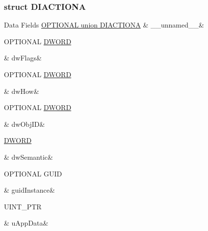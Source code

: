 \subsubsection{struct D\-I\-A\-C\-T\-I\-O\-N\-A}
\begin{DoxyFields}{Data Fields}
\hypertarget{a00003_ab73af551656ca75cd1eff9df6003a2ff}{\hyperlink{a00003_d1/dea/a00054}{O\-P\-T\-I\-O\-N\-A\-L union D\-I\-A\-C\-T\-I\-O\-N\-A}}\label{a00003_ab73af551656ca75cd1eff9df6003a2ff}
&
\-\_\-\-\_\-unnamed\-\_\-\-\_\-&
\\
\hline

\hypertarget{a00003_a1badbf389e47c0cd33257c97bd671136}{O\-P\-T\-I\-O\-N\-A\-L \hyperlink{a00003_a50e15ae51c87ae06ab29c8148cb5f36c}{D\-W\-O\-R\-D}}\label{a00003_a1badbf389e47c0cd33257c97bd671136}
&
dw\-Flags&
\\
\hline

\hypertarget{a00003_a16b081e3e54c30045be9fc209e1240ae}{O\-P\-T\-I\-O\-N\-A\-L \hyperlink{a00003_a50e15ae51c87ae06ab29c8148cb5f36c}{D\-W\-O\-R\-D}}\label{a00003_a16b081e3e54c30045be9fc209e1240ae}
&
dw\-How&
\\
\hline

\hypertarget{a00003_a731348d40f8359f7188f74164a32151e}{O\-P\-T\-I\-O\-N\-A\-L \hyperlink{a00003_a50e15ae51c87ae06ab29c8148cb5f36c}{D\-W\-O\-R\-D}}\label{a00003_a731348d40f8359f7188f74164a32151e}
&
dw\-Obj\-I\-D&
\\
\hline

\hypertarget{a00003_a772667ec2df141333fc822a8debf3224}{\hyperlink{a00003_a50e15ae51c87ae06ab29c8148cb5f36c}{D\-W\-O\-R\-D}}\label{a00003_a772667ec2df141333fc822a8debf3224}
&
dw\-Semantic&
\\
\hline

\hypertarget{a00003_a1c98d4f639357b7eec7791319541ba8c}{O\-P\-T\-I\-O\-N\-A\-L G\-U\-I\-D}\label{a00003_a1c98d4f639357b7eec7791319541ba8c}
&
guid\-Instance&
\\
\hline

\hypertarget{a00003_ac83b0c009034bac2df91a2c0bed20494}{U\-I\-N\-T\-\_\-\-P\-T\-R}\label{a00003_ac83b0c009034bac2df91a2c0bed20494}
&
u\-App\-Data&
\\
\hline

\end{DoxyFields}
\label{d1/dea/a00054}
\hypertarget{a00003_d1/dea/a00054}{}
